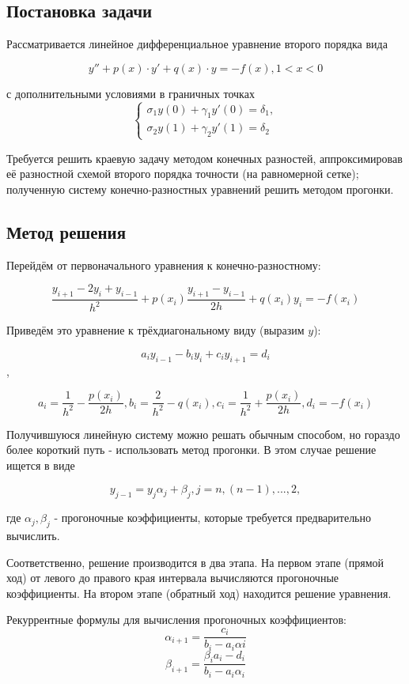 \documentclass[a4paper,11pt]{report}
\begin{document}
\subsection*{Постановка задачи}

Рассматривается линейное дифференциальное уравнение второго порядка вида

$$
y'' + p(x) \cdot y' + q(x) \cdot y = - f(x), 1 < x < 0
$$

с дополнительными условиями в граничных точках 
$$
\begin{cases}
 \sigma_1 y(0) + \gamma_1y'(0) = \delta_1,\\
 \sigma_2 y(1) + \gamma_2y'(1) = \delta_2
\end{cases}
$$

Требуется решить краевую задачу методом конечных разностей, аппроксимировав её разностной схемой второго порядка точности (на равномерной
сетке); полученную систему конечно-разностных уравнений решить методом прогонки.

\subsection*{Метод решения}

Перейдём от первоначального уравнения к конечно-разностному:

$$
\frac{y_{i+1} - 2y_i + y_{i-1}}{h^2} + p(x_i) \frac{y_{i+1} - y_{i - 1}}{2h} + q(x_i)y_i = -f(x_i)
$$

Приведём это уравнение к трёхдиагональному виду (выразим $y$):

$$
a_i y_{i-1} - b_i y_i + c_i y_{i+1} = d_i
$$,

$$
a_i = \frac{1}{h^2} - \frac{p(x_i)}{2h}, b_i = \frac{2}{h^2} - q(x_i), c_i = \frac{1}{h^2} + \frac{p(x_i)}{2h}, d_i = -f(x_i)
$$

Получившуюся линейную систему можно решать обычным способом, но гораздо более короткий путь - использовать метод прогонки.
В этом случае решение ищется в виде

$$
y_{j-1} = y_j \alpha_j + \beta_j, j = n, (n-1), ..., 2,
$$

где $\alpha_j, \beta_j$ - прогоночные коэффициенты, которые требуется предварительно вычислить.

Соответственно, решение производится в два этапа. На первом этапе (прямой ход) от левого до правого края интервала вычисляются 
прогоночные коэффициенты. На втором этапе (обратный ход) находится решение уравнения.

Рекуррентные формулы для вычисления прогоночных коэффициентов:
$$
\alpha_{i+1} = \frac{c_i}{b_i - a_i \alpha{i}}
$$
$$
\beta_{i+1} = \frac{\beta_i a_i - d_i}{b_i - a_i \alpha_i}
$$
\end{document}
